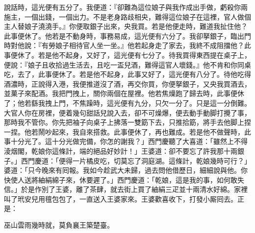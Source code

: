 說話時，這光便有五分了。我便道：『卻難為這位娘子與我作成出手做，虧殺你兩施主，一個出錢，一個出力。不是老身路歧相央，難得這位娘子在這裡，官人做個主人替娘子澆澆手。』你便取銀子出來，央我買。若是他便走時，難道我扯住他？此事便休了。他若是不動身時，事務易成，這光便有六分了。我卻拏銀子，臨出門時對他說：{}『有勞娘子相待官人坐一坐。』他若起身走了家去，我終不成阻擋他？此事便休了。若是他不起身，又好了，這光便有七分了。待我買得東西提在桌子上，便說：『娘子且收拾過生活去，且吃一盃兒酒，難得這官人壞錢。』他不肯和你同桌吃，去了，此事便休了。若是他不起身，此事又好了，這光便有八分了。待他吃得酒濃時，正說得入港，我便推道沒了酒，再交你買，你便拏銀子，又央我買酒去，並菓子來配酒。我把門拽上，關你兩個在屋裡。他若焦燥跑了歸去時，此事便休了；他若繇我拽上門，不焦躁時，這光便有九分，只欠一分了。只是這一分倒難。大官人你在房裡，便着幾句甜話兒說入去，卻不可燥爆，便去動手動脚打攪了事，那時我不管你。你先把袖子向桌子上拂落一雙筯下去，只推拾筯，將手去他脚上捏一捏。他若鬧吵起來，我自來搭救。此事便休了，再也難成。若是他不做聲時，此事十分光了。這十分光做完備，你怎的謝我？」西門慶聽了大喜道：「雖然上不得淩烟閣，乾娘你這條計，端的絕品好妙計！」王婆道：卻不要忘了許我那十兩銀子。」{}西門慶道：「便得一片橘皮吃，切莫忘了洞庭湖。這條計，乾娘幾時可行？」婆道：「只今晚來有囘報。我如今趁武大未歸，過去問他借歷日，細細說與他。你快使人送將紬絹綿子來，休要遲了。」西門慶道：「乾娘，這是我的事，如何敢失信。」於是作別了王婆，離了茶肆，就去街上買了紬絹三疋並十兩清水好綿。家裡叫了玳安兒用氊包包了，一直送入王婆家來。王婆歡喜收下，打發小厮囘去。正是：

\begin{myquote} 
巫山雲雨幾時就，莫負襄王築楚臺。
\end{myquote} 


